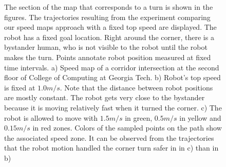 \begin{figure}[ht!]
    \caption{The section of the map that corresponds to a turn is shown in the figures. The trajectories resulting from the experiment comparing our speed maps approach with a fixed top speed are displayed. The robot has a fixed goal location. Right around the corner, there is a bystander human, who is not visible to the robot until the robot makes the turn. Points annotate robot position measured at fixed time intervals. a) Speed map of a corridor intersection at the second floor of College of Computing at Georgia Tech. b) Robot's top speed is fixed at $1.0m/s$. Note that the distance between robot positions are mostly constant. The robot gets very close to the bystander because it is moving relatively fast when it turned the corner. c) The robot is allowed to move with $1.5m/s$ in green, $0.5m/s$ in yellow and $0.15m/s$ in red zones. Colors of the sampled points on the path show the associated speed zone. It can be observed from the trajectories that the robot motion handled the corner turn safer in in c) than in b)}
   \label{fig:nav_speed_map_results}
\end{figure}

